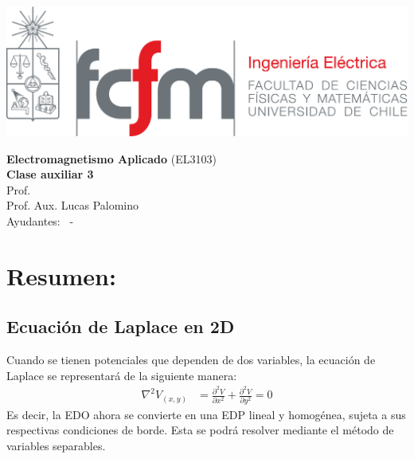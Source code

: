 \documentclass[
  11pt,
  letterpaper,
   answers
  ]{exam}
\begin{document}
\noindent
\begin{minipage}{0.47\textwidth}
  \includegraphics[width=\textwidth]{../fcfm_die}
\end{minipage}
\begin{minipage}{0.53\textwidth}
\begin{center} 
\large\textbf{Electromagnetismo Aplicado} (EL3103) \\
\large\textbf{Clase auxiliar 3} \\
\normalsize Prof.~\professor\\
\normalsize Prof. Aux. Lucas Palomino
\\
\normalsize Ayudantes: \ayudanteA~-~\ayudanteB
\end{center}
\end{minipage}

\vspace{0.5cm}
\noindent
\vspace{.85cm}
\section{Resumen:}
\subsection*{Ecuación de Laplace en 2D}
Cuando se tienen potenciales que dependen de dos variables, la ecuación de Laplace se representará de la siguiente manera:
\begin{align}
    \nabla^2 V_{(x,y)} &= \frac{\partial^2 V}{\partial x^2} + \frac{\partial^2V}{\partial y^2} = 0 
\end{align}
Es decir, la EDO ahora se convierte en una EDP lineal y homogénea, sujeta a sus respectivas condiciones de borde. Esta se podrá resolver mediante el método de variables separables.
\end{document}

